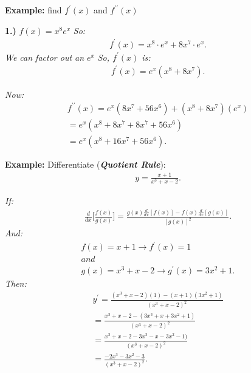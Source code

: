 \documentclass{report}
\begin{document}
  \pagebreak \bigbreak \noindent
  \begin{mdframed}
    \textbf{Example:} find $f^{\prime}(x)$ and $f ^{\prime\prime}(x)$
  \end{mdframed}

  \bigbreak \noindent 
  \textbf{1.)} $ f(x ) = x^8e^x$
  \bigbreak \noindent 
  \textit{So:}
  \begin{align*}
    f ^{\prime}(x) = x^8 \cdot e^x + 8x^7 \cdot e^x 
  .\end{align*}
  \bigbreak \noindent 
  \textit{We can factor out an $e^x$}
  \bigbreak \noindent 
  \textit{So, $f ^{\prime}(x)$ is:}
  \begin{align*}
    f ^{\prime}(x) = e^x(x^8+8x^7)
  .\end{align*}
  
  \bigbreak \noindent 
  \textit{Now:}
  \begin{align*}
    f ^{\prime\prime}(x) = e^x(8x^7+56x^6) + (x^8+8x^7)(e^x) \\ 
    = e^x(x^8 + 8x^7 + 8x^7 + 56x^6) \\ 
    = e^x(x^8 + 16x^7 + 56x^6)
  .\end{align*}

  \bigbreak \noindent 
  \begin{mdframed}
    \textbf{Example:} Differentiate (\textbf{\textit{Quotient Rule}}):
    \begin{align*}
      y = \frac{x+1}{x^3+x-2}
    .\end{align*}
  \end{mdframed}
  \bigbreak \noindent 
  \textit{If:}
  \begin{align*}
    \frac{d}{dx}\bigg[ \frac{f(x)}{g(x)}\bigg] = \frac{g(x) \frac{d}{dx}[f(x)] - f(x) \frac{d}{dx}[g(x)]}{[g(x)]^2} 
  .\end{align*}
  \bigbreak \noindent 
  \textit{And:}
  \begin{align*}
    f(x) = x+1 \longrightarrow f ^{\prime}(x) = 1 \\ 
    and \\
    g(x) = x^3 + x -2 \longrightarrow g ^{\prime}(x) = 3x^2+1
  .\end{align*}
  \bigbreak \noindent 
  \textit{Then:}
  \begin{align*}
    y ^{\prime} = \frac{(x^3+x-2)(1) - (x+1)(3x^2+1)}{(x^3+x-2)^2} \\ 
    =  \frac{x^3+x-2 -(3x^3+x+3x^2+1)}{(x^3+x-2)^2} \\
    = \frac{x^3+x-2 -3x^3-x-3x^2-1)}{(x^3+x-2)^2} \\ 
    = \frac{-2x^3-3x^2-3}{(x^3+x-2)^2}
  .\end{align*}
\end{document}
